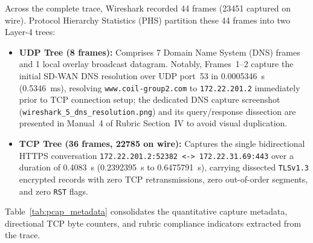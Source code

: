 Across the complete trace, Wireshark recorded \num{44} frames (\qty{23451}{\byte} captured on wire). Protocol Hierarchy Statistics (PHS) partition these \num{44} frames into two Layer-4 trees:
\begin{itemize}
    \item \textbf{UDP Tree (\num{8} frames):} Comprises \num{7} Domain Name System (DNS) frames~\cite{rfc1035} and \num{1} local overlay broadcast datagram. Notably, Frames~1--2 capture the initial SD-WAN DNS resolution over UDP port~53 in \qty{0.0005346}{\second} (\qty{0.5346}{\milli\second}), resolving \nolinkurl{www.coil-group2.com} to \nolinkurl{172.22.201.2} immediately prior to TCP connection setup; the dedicated DNS capture screenshot (\nolinkurl{wireshark_5_dns_resolution.png}) and its query/response dissection are presented in Manual~4 of Rubric Section~IV to avoid visual duplication.
    \item \textbf{TCP Tree (\num{36} frames, \qty{22785}{\byte} on wire):} Captures the single bidirectional HTTPS conversation \nolinkurl{172.22.201.2:52382 <-> 172.22.31.69:443} over a duration of \qty{0.4083}{\second} (\qty{0.2392395}{\second} to \qty{0.6475791}{\second}), carrying dissected \texttt{TLSv1.3} encrypted records with zero TCP retransmissions, zero out-of-order segments, and zero \texttt{RST} flags.
\end{itemize}

Table~\ref{tab:pcap_metadata} consolidates the quantitative capture metadata, directional TCP byte counters, and rubric compliance indicators extracted from the trace.

